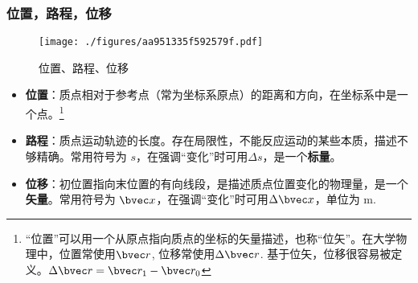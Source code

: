 \subsubsection{位置，路程，位移}
\begin{figure}[ht]
\centering
\texttt{[image: ./figures/aa951335f592579f.pdf]}
\caption{位置、路程、位移} \label{fig_HSPM01_3}
\end{figure}
\begin{itemize}
\item \textbf{位置}：质点相对于参考点（常为坐标系原点）的距离和方向，在坐标系中是一个点。\footnote{“位置”可以用一个从原点指向质点的坐标的矢量描述，也称“位矢”。在大学物理中，位置常使用$\bvec r$, 位移常使用$\Delta \bvec r$. 基于位矢，位移很容易被定义。$\Delta \bvec r = \bvec r_1 - \bvec r_0$}
\item \textbf{路程}：质点运动轨迹的长度。存在局限性，不能反应运动的某些本质，描述不够精确。常用符号为 $s$，在强调“变化”时可用$\Delta s$，是一个\textbf{标量}。
\item \textbf{位移}：初位置指向末位置的有向线段，是描述质点位置变化的物理量，是一个\textbf{矢量}。常用符号为 $\bvec x$，在强调“变化”时可用$\Delta \bvec x$，单位为 $\mathrm{m}$.
\end{itemize}

